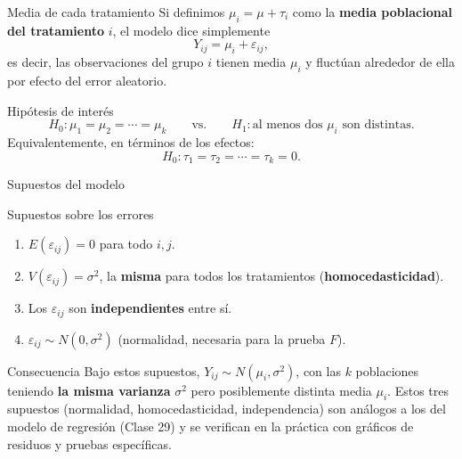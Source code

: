 \documentclass[aspectratio=169,11pt]{beamer}
\begin{document}
\begin{frame}{Media de cada tratamiento}
Si definimos $\mu_i = \mu + \tau_i$ como la \textbf{media poblacional del tratamiento} $i$, el modelo dice simplemente
\[
Y_{ij} = \mu_i + \varepsilon_{ij},
\]
es decir, las observaciones del grupo $i$ tienen media $\mu_i$ y fluctúan alrededor de ella por efecto del error aleatorio.

\begin{block}{Hipótesis de interés}
\[
H_0: \mu_1=\mu_2=\cdots=\mu_k \qquad \text{vs.} \qquad H_1: \text{al menos dos } \mu_i \text{ son distintas.}
\]
Equivalentemente, en términos de los efectos:
\[
H_0: \tau_1=\tau_2=\cdots=\tau_k=0.
\]
\end{block}
\end{frame}

\begin{frame}{Supuestos del modelo}
\begin{block}{Supuestos sobre los errores}
\begin{enumerate}
\item $E(\varepsilon_{ij})=0$ para todo $i,j$.
\item $V(\varepsilon_{ij}) = \sigma^2$, la \textbf{misma} para todos los tratamientos (\textbf{homocedasticidad}).
\item Los $\varepsilon_{ij}$ son \textbf{independientes} entre sí.
\item $\varepsilon_{ij} \sim N(0,\sigma^2)$ (normalidad, necesaria para la prueba $F$).
\end{enumerate}
\end{block}

\begin{alertblock}{Consecuencia}
Bajo estos supuestos, $Y_{ij}\sim N(\mu_i,\sigma^2)$, con las $k$ poblaciones teniendo \textbf{la misma varianza} $\sigma^2$ pero posiblemente distinta media $\mu_i$. Estos tres supuestos (normalidad, homocedasticidad, independencia) son análogos a los del modelo de regresión (Clase 29) y se verifican en la práctica con gráficos de residuos y pruebas específicas.
\end{alertblock}
\end{frame}
\end{document}
